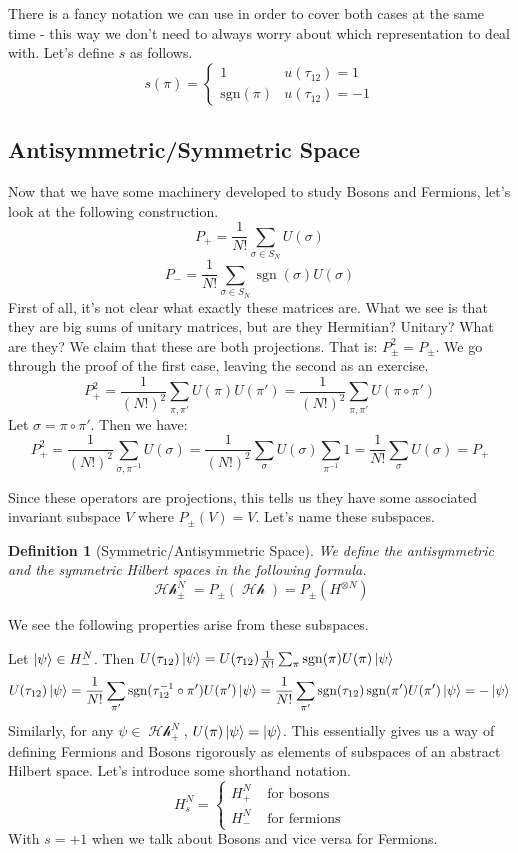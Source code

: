 \documentclass{article}
\DeclareMathOperator{\Hh}{\mathcal{Hh}}
\DeclareMathOperator{\sgn}{\textrm{sgn}}
\newtheorem{defn}{Definition}
\begin{document}
There is a fancy notation we can use in order to cover both cases at the same time - this way we don't need to always worry about which representation to deal with. Let's define $s$ as follows.
\[s(\pi)=\begin{cases}1 & u(\tau_{12})=1\\
\textrm{sgn}(\pi) & u(\tau_{12})=-1
\end{cases}\]
\pagebreak

\subsection{Antisymmetric/Symmetric Space}
Now that we have some machinery developed to study Bosons and Fermions, let's look at the following construction.
\begin{equation}
P_{+} = \frac{1}{N!}\sum_{\sigma \in S_N} U(\sigma)
\end{equation}
\begin{equation}
P_{-} = \frac{1}{N!}\sum_{\sigma \in S_N} \sgn(\sigma) U(\sigma)
\end{equation}
First of all, it's not clear what exactly these matrices are. What we see is that they are big sums of unitary matrices, but are they Hermitian? Unitary? What are they? We claim that these are both projections. That is: $P_{\pm}^2 = P_{\pm}$. We go through the proof of the first case, leaving the second as an exercise.
\[P_+^2 = \frac{1}{(N!)^2} \sum_{\pi,\pi'}U(\pi)U(\pi') = \frac{1}{(N!)^2}\sum_{\pi,\pi'} U(\pi \circ \pi')\]
Let $\sigma = \pi\circ \pi'$. Then we have:
\[P_+^2 = \frac{1}{(N!)^2} \sum_{\sigma,\pi^{-1}}U(\sigma) = \frac{1}{(N!)^2}\sum_{\sigma}U(\sigma) \sum_{\pi^{-1}}1 = \frac{1}{N!}\sum_{\sigma} U(\sigma) = P_+\]

Since these operators are projections, this tells us they have some associated invariant subspace $V$ where $P_\pm (V) = V$. Let's name these subspaces.
\begin{defn}[Symmetric/Antisymmetric Space]
We define the antisymmetric and the symmetric Hilbert spaces in the following formula.
\begin{equation}
\Hh_\pm^N = P_\pm(\Hh) = P_\pm(H^{\otimes N})
\end{equation}
\end{defn}
We see the following properties arise from these subspaces. 

Let $\ket{\psi} \in H_-^N$. Then $U(\tau_{12}) \ket{\psi} = U(\tau_{12}) \frac{1}{N!}\sum_{\pi}\sgn(\pi)U(\pi) \ket{\psi}$
\[U(\tau_{12})\ket{\psi} = \frac{1}{N!}\sum_{\pi'}\sgn(\tau_{12}^{-1}\circ \pi')U(\pi') \ket{\psi} = \frac{1}{N!}\sum_{\pi'}\sgn(\tau_{12})\sgn(\pi')U(\pi')\ket{\psi}=-\ket{\psi}\] Similarly, for any $\psi \in \Hh_+^N$, $U(\pi)\ket{\psi} = \ket{\psi}$. This essentially gives us a way of defining Fermions and Bosons rigorously as elements of subspaces of an abstract Hilbert space.
\pagebreak
Let's introduce some shorthand notation.
\[H_s^N = \begin{cases}H_+^N & \textrm{ for bosons} \\ H_-^N & \textrm{ for fermions}\end{cases}\]
With $s = +1$ when we talk about Bosons and vice versa for Fermions.
\end{document}
